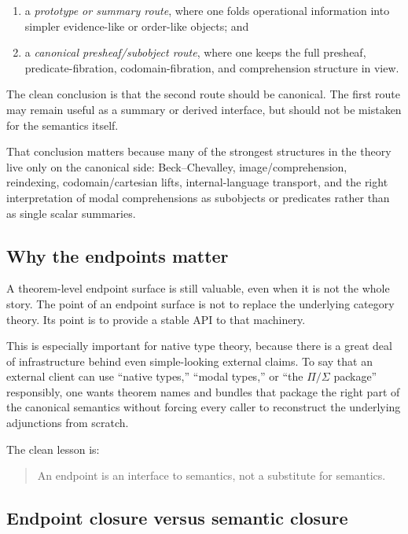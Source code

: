 \documentclass[11pt]{article}
\begin{document}
\begin{enumerate}
  \item a \emph{prototype or summary route}, where one folds operational information into simpler evidence-like or order-like objects; and
  \item a \emph{canonical presheaf/subobject route}, where one keeps the full presheaf, predicate-fibration, codomain-fibration, and comprehension structure in view.
\end{enumerate}

The clean conclusion is that the second route should be canonical. The first route may remain useful as a summary or derived interface, but should not be mistaken for the semantics itself.

That conclusion matters because many of the strongest structures in the theory live only on the canonical side: Beck--Chevalley, image/comprehension, reindexing, codomain/cartesian lifts, internal-language transport, and the right interpretation of modal comprehensions as subobjects or predicates rather than as single scalar summaries.

\subsection{Why the endpoints matter}

A theorem-level endpoint surface is still valuable, even when it is not the whole story. The point of an endpoint surface is not to replace the underlying category theory. Its point is to provide a stable API to that machinery.

This is especially important for native type theory, because there is a great deal of infrastructure behind even simple-looking external claims. To say that an external client can use ``native types,'' ``modal types,'' or ``the $\Pi/\Sigma$ package'' responsibly, one wants theorem names and bundles that package the right part of the canonical semantics without forcing every caller to reconstruct the underlying adjunctions from scratch.

The clean lesson is:

\begin{quote}
An endpoint is an interface to semantics, not a substitute for semantics.
\end{quote}

\subsection{Endpoint closure versus semantic closure}
\end{document}
